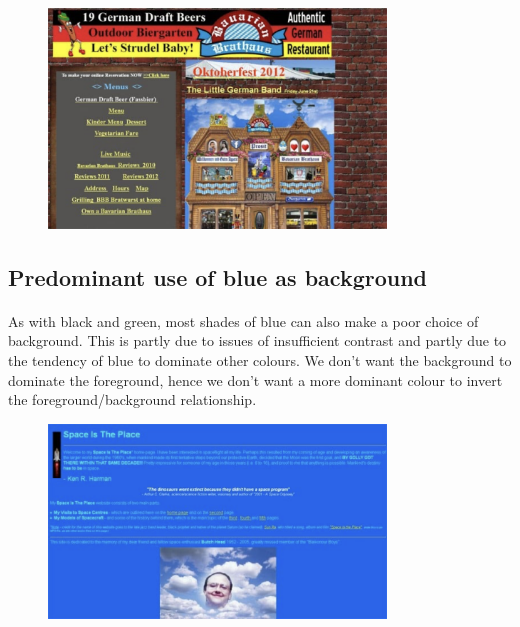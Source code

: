\begin{figure}[H]
    \centering
    \includegraphics[width=0.8\textwidth]{figures/bad-colours-too-many-colours-3}
    \label{fig:bad-colours-too-many-colours-3}
    \caption{}
\end{figure}





\subsection{Predominant use of blue as background}
\paragraph{} As with black and green, most shades of blue can also make a poor choice of background. This is partly due to issues of insufficient contrast and partly due to the tendency of blue to dominate other colours. We don't want the background to dominate the foreground, hence we don't want a more dominant colour to invert the foreground/background relationship.


\begin{figure}[H]
    \centering
    \includegraphics[width=0.8\textwidth]{figures/bad-colours_blue-background-1}
    \label{fig:bad-colours_blue-background-1}
    \caption{}
\end{figure}


